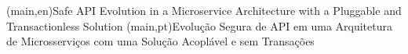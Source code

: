 
%


\nttitle(main,en){Safe API Evolution in a Microservice Architecture with a Pluggable and Transactionless Solution}%
\nttitle(main,pt){Evolução Segura de API em uma Arquitetura de Microsserviços com uma Solução Acoplável e sem Transações}%




